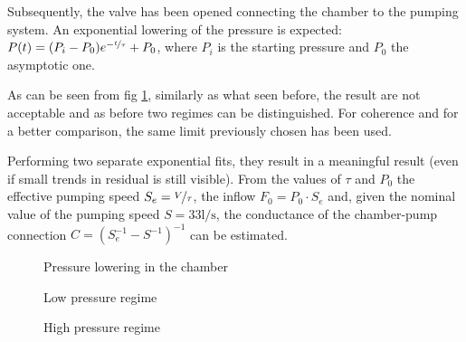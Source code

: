 \documentclass[11pt,a4 paper]{article}
\let\oldfrac\frac
\renewcommand{\frac}[3][d]{\ifthenelse{\equal{#1}{d}}{\oldfrac{#2}{#3}}{\nicefrac{#2}{#3}}}
\begin{document}
Subsequently, the valve has been opened connecting the chamber to the pumping system. An exponential lowering of the pressure is expected: $P(t) = (P_i - P_0)e^{-\frac[f]{t}{\tau}} + P_0$, where $P_i$ is the starting pressure and $P_0$ the asymptotic one.

As can be seen from fig \ref{fig:decrease_all}, similarly as what seen before, the result are not acceptable and as before two regimes can be distinguished. For coherence and for a better comparison, the same limit previously chosen has been used.

Performing two separate exponential fits, they result in a meaningful result (even if small trends in residual is still visible). From the values of $\tau$ and $P_0$ the effective pumping speed $S_e= \frac[f]{V}{\tau}$, the inflow $F_0 = P_0 \cdot S_e$ and, given the nominal value of the pumping speed $S = 33 \si{\litre\per\second}$, the conductance of the chamber-pump connection $C = (S_e^{-1} - S^{-1})^{-1}$ can be estimated.

\begin{figure}[H]
  \centering
   \hspace{-0.05\textwidth}
  \caption{Pressure lowering in the chamber}
  \label{fig:decrease_all}
\end{figure}

\begin{figure}[H]
  \centering
   \hspace{-0.05\textwidth}
  \caption{Low pressure regime}
  \label{fig:decrease_lowP}
\end{figure}

\begin{figure}[H]
  \centering
   \hspace{-0.05\textwidth}
  \caption{High pressure regime}
  \label{fig:decrease_highP}
\end{figure}


\end{document}
